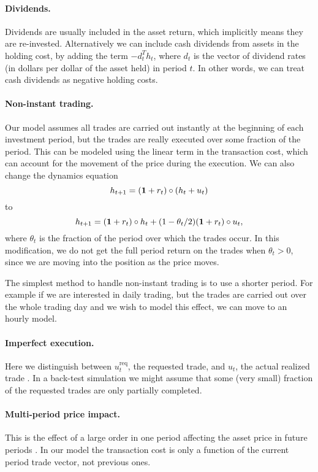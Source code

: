 \documentclass[openany]{article}  %
\begin{document}
\paragraph{Dividends.}  Dividends are usually included in the asset
return, which implicitly means they are re-invested.
Alternatively we can include cash dividends from assets in the
holding cost, by adding
the term $-d_t^T h_t$, where $d_t$ is the vector of dividend rates
(in dollars per dollar of the asset held) in period $t$.
In other words, we can treat cash dividends as negative holding costs.

\paragraph{Non-instant trading.} Our model assumes all trades are
carried out instantly at the beginning of each investment period,
but the trades are really executed over some fraction of the period.
This can be modeled using the linear term in the transaction
cost, which can account for the movement of the price during the
execution.
We can also change the dynamics equation
\[
h_{t+1} = (\mathbf 1 + r_t) \circ (h_t + u_t)
\]
to
\[
h_{t+1} = (\mathbf 1 + r_t) \circ h_t + (1-\theta_t/2) (\mathbf 1 + r_t)\circ u_t,
\]
where $\theta_t$ is the fraction of the period over which the trades occur.
In this modification, we do not get the full period return on the
trades when $\theta_t>0$, since we are moving into the position as the
price moves.

The simplest method to handle non-instant trading is to use a shorter
period.  For example if we are interested in daily trading, but the trades are
carried out over the whole trading day and we wish to model this effect,
we can move to an hourly model.

\paragraph{Imperfect execution.}  Here we distinguish between $u^\mathrm{req}_t$,
the requested trade, and $u_t$, the actual realized trade \cite{perold1998implementation}.
In a back-test simulation we might assume that some
(very small) fraction of the requested trades are only partially completed.

\paragraph{Multi-period price impact.}
This is the effect of a
large order in one period affecting the asset price in future periods
\cite{almgren2001optimal, obizhaeva2006optimal}.
In our model the transaction cost is only a function of the current
period trade vector, not previous ones.
\end{document}
